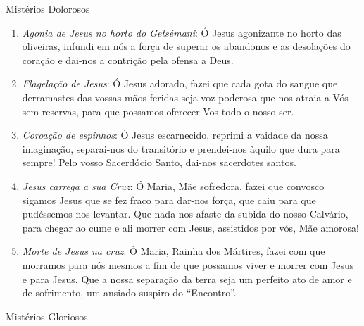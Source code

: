 \documentclass[10pt,twoside,a5paper]{article}
\begin{document}
	Mistérios Dolorosos
	
	\begin{enumerate}
		\item \textit{Agonia de Jesus no horto do Getsémani}: Ó Jesus agonizante no horto das oliveiras, infundi em nós a força de superar os abandonos e as desolações do coração e dai-nos a contrição pela ofensa a Deus.
		
		\item \textit{Flagelação de Jesus}: Ó Jesus adorado, fazei que cada gota do sangue que derramastes das vossas mãos feridas seja voz poderosa que nos atraia a Vós sem reservas, para que possamos oferecer-Vos todo o nosso ser.
		
		\item \textit{Coroação de espinhos}: Ó Jesus escarnecido, reprimi a vaidade da nossa imaginação, separai-nos do transitório e prendei-nos àquilo que dura para sempre! Pelo vosso Sacerdócio Santo, dai-nos sacerdotes santos.
		
		\item \textit{Jesus carrega a sua Cruz}: Ó Maria, Mãe sofredora, fazei que convosco sigamos Jesus que se fez fraco para dar-nos força, que caiu para que pudéssemos nos levantar. Que nada nos afaste da subida do nosso Calvário, para chegar ao cume e ali morrer com Jesus, assistidos por vós, Mãe amorosa!
		
		\item \textit{Morte de Jesus na cruz}: Ó Maria, Rainha dos Mártires, fazei com que morramos para nós mesmos a fim de que possamos viver e morrer com Jesus e para Jesus. Que a nossa separação da terra seja um perfeito ato de amor e de sofrimento, um ansiado suspiro do ``Encontro''.
	\end{enumerate}
	
	Mistérios Gloriosos
	
\end{document}
